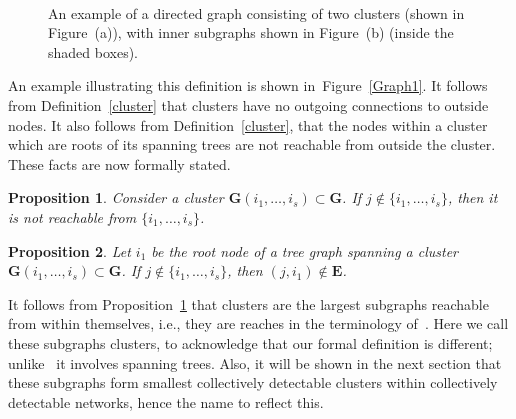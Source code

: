\documentclass[a4paper,10pt,conference]{ieeeconf}
\newtheorem{proposition}{Proposition}
\begin{document}
\begin{figure}[t]
\mbox{}
\vspace*{10pt}

 \centering
 \\
 \label{Example.Graph}
 \caption{An example of a directed graph consisting of two clusters (shown
   in Figure~(a)), with inner subgraphs shown in Figure~(b) (inside
   the shaded boxes).}
\end{figure}

An example illustrating this definition is shown in~Figure~\ref{Graph1}.
It follows from Definition~\ref{cluster} that clusters have no outgoing
connections to outside nodes. 
It also follows from Definition~\ref{cluster}, that the nodes within a
cluster which are roots of its spanning trees are not reachable from
outside the cluster. These facts are now formally stated.

\begin{proposition}\label{cluster.closed}
Consider a cluster $\mathbf{G}(i_1,\ldots,i_s)\subset \mathbf{G}$. If
$j\not\in \{i_1,\ldots,i_s\}$, then it is not reachable from
$\{i_1,\ldots,i_s\}$.  
\end{proposition}

\begin{proposition}\label{roots.unreach}
Let $i_1$ be the root node of a tree graph spanning a cluster
$\mathbf{G}(i_1,\ldots,i_s)\subset \mathbf{G}$. If $j\not \in
\{i_1,\ldots,i_s\}$, then $(j,i_1)\not\in\mathbf{E}$. 
\end{proposition}


It follows from Proposition~\ref{cluster.closed} that clusters are
the largest subgraphs reachable from within themselves, i.e., they
are reaches in the terminology of~\cite{CV-2006}. Here we call these subgraphs
clusters, to acknowledge that our formal definition is 
different; unlike~\cite{CV-2006} it involves spanning trees. 
Also, it will be shown in the next section that these subgraphs form
smallest collectively detectable clusters within collectively detectable
networks, hence the name to reflect this. 
\end{document}

